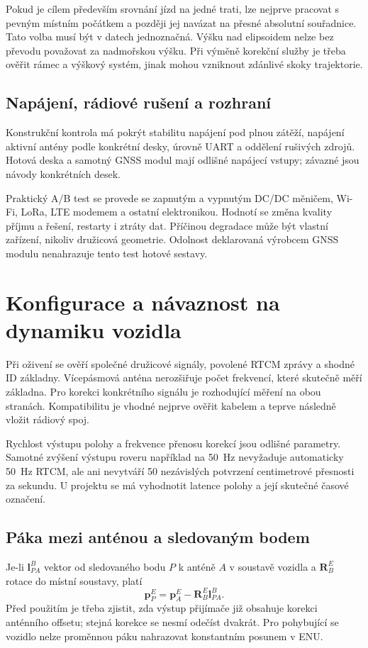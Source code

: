\documentclass[11pt,a4paper]{article}
\begin{document}
Pokud je cílem především srovnání jízd na jedné trati, lze nejprve pracovat s pevným místním počátkem a později jej navázat na přesné absolutní souřadnice. Tato volba musí být v datech jednoznačná. Výšku nad elipsoidem nelze bez převodu považovat za nadmořskou výšku. Při výměně korekční služby je třeba ověřit rámec a výškový systém, jinak mohou vzniknout zdánlivé skoky trajektorie.

\subsection{Napájení, rádiové rušení a rozhraní}
Konstrukční kontrola má pokrýt stabilitu napájení pod plnou zátěží, napájení aktivní antény podle konkrétní desky, úrovně UART a oddělení rušivých zdrojů. Hotová deska a samotný GNSS modul mají odlišné napájecí vstupy; závazné jsou návody konkrétních desek.\cite{board-f9p,board-x5}

Praktický A/B test se provede se zapnutým a vypnutým DC/DC měničem, Wi-Fi, LoRa, LTE modemem a ostatní elektronikou. Hodnotí se změna kvality příjmu a řešení, restarty i ztráty dat. Příčinou degradace může být vlastní zařízení, nikoliv družicová geometrie. Odolnost deklarovaná výrobcem GNSS modulu nenahrazuje tento test hotové sestavy.

\section{Konfigurace a návaznost na dynamiku vozidla}
Při oživení se ověří společné družicové signály, povolené RTCM zprávy a shodné ID základny. Vícepásmová anténa nerozšiřuje počet frekvencí, které skutečně měří základna. Pro korekci konkrétního signálu je rozhodující měření na obou stranách. Kompatibilitu je vhodné nejprve ověřit kabelem a teprve následně vložit rádiový spoj.

Rychlost výstupu polohy a frekvence přenosu korekcí jsou odlišné parametry. Samotné zvýšení výstupu roveru například na 50~Hz nevyžaduje automaticky 50~Hz RTCM, ale ani nevytváří 50 nezávislých potvrzení centimetrové přesnosti za sekundu. U projektu se má vyhodnotit latence polohy a její skutečné časové označení.

\subsection{Páka mezi anténou a sledovaným bodem}
Je-li $\mathbf l_{PA}^{B}$ vektor od sledovaného bodu $P$ k anténě $A$ v soustavě vozidla a $\mathbf R_B^E$ rotace do místní soustavy, platí
\begin{equation}
 \mathbf p_P^E=\mathbf p_A^E-\mathbf R_B^E\mathbf l_{PA}^{B}.
\end{equation}
Před použitím je třeba zjistit, zda výstup přijímače již obsahuje korekci anténního offsetu; stejná korekce se nesmí odečíst dvakrát. Pro pohybující se vozidlo nelze proměnnou páku nahrazovat konstantním posunem v ENU.
\end{document}
